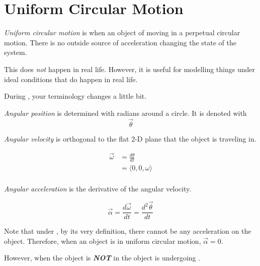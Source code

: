\section{Uniform Circular Motion} \label{sec:Uniform Circular Motion}
\begin{definition} \label{def:Uniform Circular Motion}
  \emph{Uniform circular motion} is when an object of moving in a perpetual circular motion.
  There is no outside source of acceleration changing the state of the system.
  \begin{remark}
    This does \emph{not} happen in real life.
    However, it is useful for modelling things under ideal conditions that do happen in real life.
  \end{remark}
\end{definition}

During , your terminology changes a little bit.
\begin{definition} \label{def:Angular Position}
  \emph{Angular position} is determined with radians around a circle.
  It is denoted with \[ \vec{\theta} \]
\end{definition}

\begin{definition} \label{def:Angular Velocity}
  \emph{Angular velocity} is orthogonal to the flat 2-D plane that the object is traveling in.

  \begin{equation} \label{eq:Angular Velocity}
    \begin{aligned}
      \vec{\omega} &= \frac{d \theta}{dt} \\
      &= \langle 0, 0, \omega \rangle \\
    \end{aligned}
  \end{equation}
\end{definition}

\begin{definition} \label{def:Angular Acceleration}
  \emph{Angular acceleration} is the derivative of the angular velocity.

  \begin{equation} \label{eq:Angular Acceleration}
    \vec{\alpha} = \frac{d \vec{\omega}}{dt} = \frac{d^{2} \vec{\theta}}{dt}
  \end{equation}

  \begin{remark}
    Note that under , by its very definition, there cannot be any acceleration on the object.
    Therefore, when an object is in uniform circular motion, $\vec{\alpha} = 0$.

    However, when the object is \textbf{\emph{NOT}} in  the object is undergoing .
  \end{remark}
\end{definition}

